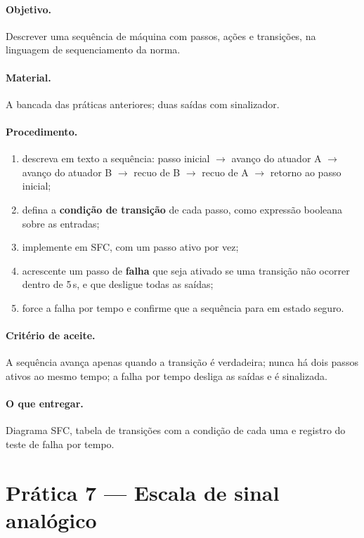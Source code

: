 \paragraph{Objetivo.} Descrever uma sequência de máquina com passos, ações e transições, na
linguagem de sequenciamento da norma.

\paragraph{Material.} A bancada das práticas anteriores; duas saídas com sinalizador.

\paragraph{Procedimento.}
\begin{enumerate}
  \item descreva em texto a sequência: passo inicial $\rightarrow$ avanço do atuador A
        $\rightarrow$ avanço do atuador B $\rightarrow$ recuo de B $\rightarrow$ recuo de A
        $\rightarrow$ retorno ao passo inicial;
  \item defina a \textbf{condição de transição} de cada passo, como expressão booleana sobre as
        entradas;
  \item implemente em SFC, com um passo ativo por vez;
  \item acrescente um passo de \textbf{falha} que seja ativado se uma transição não ocorrer dentro de
        5\,s, e que desligue todas as saídas;
  \item force a falha por tempo e confirme que a sequência para em estado seguro.
\end{enumerate}

\paragraph{Critério de aceite.} A sequência avança apenas quando a transição é verdadeira; nunca há
dois passos ativos ao mesmo tempo; a falha por tempo desliga as saídas e é sinalizada.

\paragraph{O que entregar.} Diagrama SFC, tabela de transições com a condição de cada uma e registro
do teste de falha por tempo.

\section{Prática 7 --- Escala de sinal analógico}

